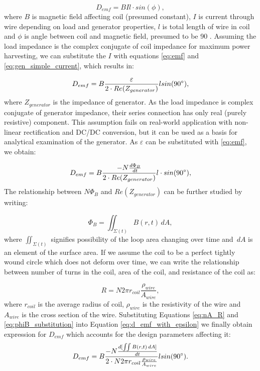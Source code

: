\begin{equation}\label{eq:d_emd}
  D_{emf} = BIl \cdot sin(\phi),
\end{equation}
where $B$ is magnetic field affecting coil (presumed constant), $I$ is current through wire depending on load and generator properties, $l$ is total length of wire in coil and $\phi$ is angle between coil and magnetic field, presumed to be 90 \degree. Assuming the load impedance is the complex conjugate of coil impedance for maximum power harvesting, we can substitute the $I$ with equations \eqref{eq:emf} and \eqref{eq:gen_simple_current}, which results in: 

\begin{equation}
  D_{emf} = B \frac{\varepsilon}{2 \cdot Re(Z_{generator})} l sin(90 \degree),
\end{equation}
where $Z_{generator}$ is the impedance of generator. As the load impedance is complex conjugate of generator impedance, their series connection has only real (purely resistive) component. This assumption fails on real-world application with non-linear rectification and DC/DC conversion, but it can be used as a basis for analytical examination of the generator. As $\varepsilon$ can be substituted with \eqref{eq:emf}, we obtain:

\begin{equation}\label{eq:d_emf_with_epsilon}
  D_{emf} = B \frac{-N \frac{d \Phi_{B}}{d t}}{2 \cdot Re(Z_{generator})} l \cdot sin(90 \degree),
\end{equation}
The relationship between $N \Phi_{B}$ and $Re(Z_{generator})$ can be further studied by writing: 

\begin{equation}\label{eq:phiB_substitution}
  \Phi_{B} = \iint_{\Sigma (t)} B(r, t) \,dA,
\end{equation}
where $ \iint_{\Sigma (t)} $ signifies possibility of the loop area changing over time and $\,dA$ is an element of the surface area. If we assume the coil to be a perfect tightly wound circle which does not deform over time, we can write the relationship between number of turns in the coil, area of the coil, and resistance of the coil as:

\begin{equation}\label{eq:nA_R}
  R = N 2\pi r_{coil} \frac{\rho_{wire}}{A_{wire}},
\end{equation}
where $r_{coil}$ is the average radius of coil, $\rho_{wire}$ is the resistivity of the wire and $A_{wire}$ is the cross section of the wire. Substituting Equations \eqref{eq:nA_R} and \eqref{eq:phiB_substitution} into Equation \eqref{eq:d_emf_with_epsilon} we finally obtain expression for $D_{emf}$ which accounts for the design parameters affecting it:
\begin{equation}\label{eq:d_emf_complete}
  D_{emf} = B \frac{-N \frac{d [\iint B(r, t) \,dA]}{d t}}{2 \cdot N 2\pi r_{coil} \frac{\rho_{wire}}{A_{wire}}} l sin(90 \degree).
\end{equation}

